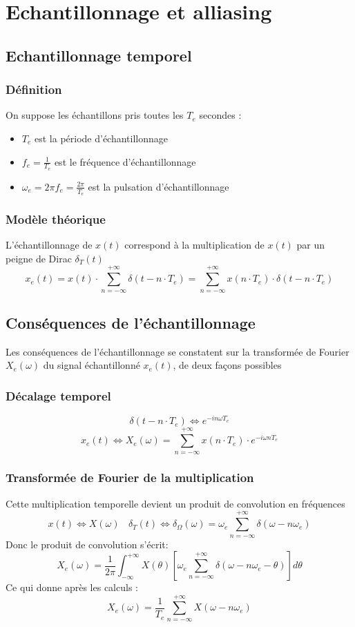 \documentclass[10pt,a4paper,twoside]{article}
\begin{document}
\section{Echantillonnage et alliasing}
\subsection{Echantillonnage temporel}
\subsubsection{Définition}
On suppose les échantillons pris toutes les $T_{e}$ secondes :
\begin{itemize}
\item $T_{e}$ est la période d'échantillonnage
\item $f_{e} = \frac{1}{T_{e}}$ est le fréquence d'échantillonnage
\item $\omega_{e} = 2\pi f_{e} = \frac{2\pi}{T_{e}}$ est la pulsation d'échantillonnage
\end{itemize}

\subsubsection{Modèle théorique}
L'échantillonnage de $x(t)$ correspond à la multiplication de $x(t)$ par un peigne de Dirac $\delta_{T}(t)$
$$x_{e}(t)=x(t)\cdot \sum_{n=-\infty}^{+\infty}\delta(t-n\cdot T_{e})=\sum_{n=-\infty}^{+\infty}x(n\cdot T_{e})\cdot \delta(t-n\cdot T_{e})$$

\subsection{Conséquences de l'échantillonnage}
Les conséquences de l'échantillonnage se constatent sur la transformée de Fourier $X_{e}(\omega)$ du signal échantillonné $x_{e}(t)$, de deux façons possibles
\subsubsection{Décalage temporel}
$$\delta(t-n\cdot T_{e}) \Leftrightarrow e^{-in\omega T_{e}}$$
$$ x_{e}(t) \Leftrightarrow X_{e}(\omega)=\sum_{n=-\infty}^{+\infty}x(n\cdot T_{e})\cdot e^{-i\omega nT_{e}}$$
\subsubsection{Transformée de Fourier de la multiplication}
Cette multiplication temporelle devient un produit de convolution en fréquences
$$x(t) \Leftrightarrow X(\omega)\ \ \ \ \delta_{T}(t) \Leftrightarrow \delta_{\Omega}(\omega)=\omega_{e}\sum_{n=-\infty}^{+\infty}\delta(\omega-n\omega_{e})$$
Donc le produit de convolution s'écrit:
$$X_{e}(\omega) = \frac{1}{2\pi} \int_{-\infty}^{+\infty}X(\theta)[\omega_{e}\sum_{n=-\infty}^{+\infty}\delta(\omega-n\omega_{e}-\theta)]d\theta$$
Ce qui donne après les calculs :
$$X_{e}(\omega)=\frac{1}{T_{e}}\sum_{n=-\infty}^{+\infty}X(\omega-n\omega_{e})$$
\end{document}
